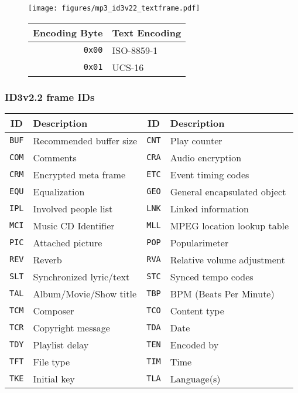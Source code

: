 \pagebreak

\begin{figure}[h]
\texttt{[image: figures/mp3\_id3v22\_textframe.pdf]}
\begin{tabular}{r|l}
Encoding Byte & Text Encoding \\
\hline
\texttt{0x00} & ISO-8859-1 \\
\texttt{0x01} & UCS-16 \\
\end{tabular}
\end{figure}

\subsubsection{ID3v2.2 frame IDs}
\begin{table}[h]
{
\begin{tabular}{|c|l||c|l|}
\hline
ID & Description & ID & Description \\
\hline
\texttt{BUF} & Recommended buffer size & \texttt{CNT} & Play counter \\
\texttt{COM} & Comments & \texttt{CRA} & Audio encryption \\
\texttt{CRM} & Encrypted meta frame & \texttt{ETC} & Event timing codes \\
\texttt{EQU} & Equalization & \texttt{GEO} & General encapsulated object \\
\texttt{IPL} & Involved people list & \texttt{LNK} & Linked information \\
\texttt{MCI} & Music CD Identifier & \texttt{MLL} & MPEG location lookup table \\
\texttt{PIC} & Attached picture & \texttt{POP} & Popularimeter \\
\texttt{REV} & Reverb & \texttt{RVA} & Relative volume adjustment \\
\texttt{SLT} & Synchronized lyric/text & \texttt{STC} & Synced tempo codes \\
\texttt{TAL} & Album/Movie/Show title & \texttt{TBP} & BPM (Beats Per Minute) \\
\texttt{TCM} & Composer & \texttt{TCO} & Content type \\
\texttt{TCR} & Copyright message & \texttt{TDA} & Date \\
\texttt{TDY} & Playlist delay & \texttt{TEN} & Encoded by \\
\texttt{TFT} & File type & \texttt{TIM} & Time \\
\texttt{TKE} & Initial key & \texttt{TLA} & Language(s) \\

\end{tabular}}
\end{table}
